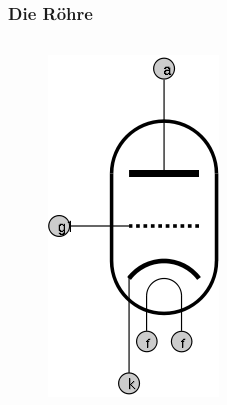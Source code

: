 \begin{frame}
  \frametitle{Die Röhre}
  \begin{columns}
    \begin{figure}
      \includegraphics[width=\textwidth,height=.7\textheight,keepaspectratio]{a06/ERohre.png}

\end{figure}
\end{columns}
\end{frame}
